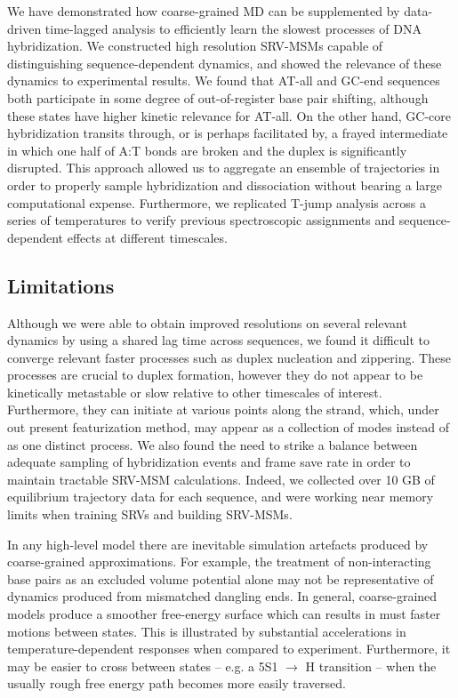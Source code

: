 \documentclass[journal=jpcbfk,manuscript=article]{achemso}
\begin{document}
We have demonstrated how coarse-grained MD can be supplemented by data-driven time-lagged analysis to efficiently learn the slowest processes of DNA hybridization. We constructed high resolution SRV-MSMs capable of distinguishing sequence-dependent dynamics, and showed the relevance of these dynamics to experimental results. We found that AT-all and GC-end sequences both participate in some degree of out-of-register base pair shifting, although these states have higher kinetic relevance for AT-all. On the other hand, GC-core hybridization transits through, or is perhaps facilitated by, a frayed intermediate in which one half of A:T bonds are broken and the duplex is significantly disrupted. This approach allowed us to aggregate an ensemble of trajectories in order to properly sample hybridization and dissociation without bearing a large computational expense. Furthermore, we replicated T-jump analysis across a series of temperatures to verify previous spectroscopic assignments and sequence-dependent effects at different timescales.

\subsection{\label{sec:conc}Limitations} 

Although we were able to obtain improved resolutions on several relevant dynamics by using a shared lag time across sequences, we found it difficult to converge relevant faster processes such as duplex nucleation and zippering. These processes are crucial to duplex formation, however they do not appear to be kinetically metastable or slow relative to other timescales of interest. Furthermore, they can initiate at various points along the strand, which, under out present featurization method, may appear as a collection of modes instead of as one distinct process. We also found the need to strike a balance between adequate sampling of hybridization events and frame save rate in order to maintain tractable SRV-MSM calculations. Indeed, we collected over 10 GB of equilibrium trajectory data for each sequence, and were working near memory limits when training SRVs and building SRV-MSMs.

In any high-level model there are inevitable simulation artefacts produced by coarse-grained approximations. For example, the treatment of non-interacting base pairs as an excluded volume potential alone may not be representative of dynamics produced from mismatched dangling ends. In general, coarse-grained models produce a smoother free-energy surface which can results in must faster motions between states. This is illustrated by substantial accelerations in temperature-dependent responses when compared to experiment. Furthermore, it may be easier to cross between states -- e.g. a 5S1 $\rightarrow$ H transition -- when the usually rough free energy path becomes more easily traversed. 
\end{document}
